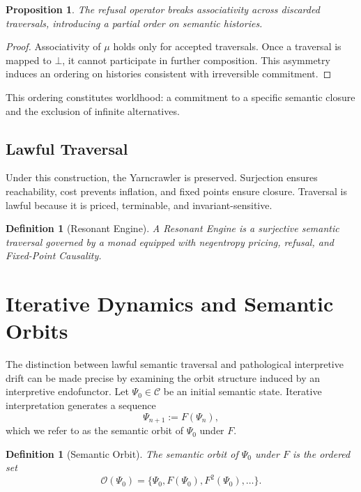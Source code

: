 \documentclass[12pt]{article}
\newtheorem{definition}[theorem]{Definition}
\newtheorem{proposition}[theorem]{Proposition}
\theoremstyle{remark}
\begin{document}
\begin{proposition}
The refusal operator breaks associativity across discarded traversals, introducing a partial order on semantic histories.
\end{proposition}

\begin{proof}
Associativity of $\mu$ holds only for accepted traversals. Once a traversal is mapped to $\bot$, it cannot participate in further composition. This asymmetry induces an ordering on histories consistent with irreversible commitment.
\end{proof}

This ordering constitutes worldhood: a commitment to a specific semantic closure and the exclusion of infinite alternatives.

\subsection{Lawful Traversal}

Under this construction, the Yarncrawler is preserved. Surjection ensures reachability, cost prevents inflation, and fixed points ensure closure. Traversal is lawful because it is priced, terminable, and invariant-sensitive.

\begin{definition}[Resonant Engine]
A Resonant Engine is a surjective semantic traversal governed by a monad equipped with negentropy pricing, refusal, and Fixed-Point Causality.
\end{definition}

\section{Iterative Dynamics and Semantic Orbits}

The distinction between lawful semantic traversal and pathological interpretive drift can be made precise by examining the orbit structure induced by an interpretive endofunctor. Let $\Psi_0 \in \mathcal{C}$ be an initial semantic state. Iterative interpretation generates a sequence
\[
\Psi_{n+1} := F(\Psi_n),
\]
which we refer to as the semantic orbit of $\Psi_0$ under $F$.

\begin{definition}[Semantic Orbit]
The semantic orbit of $\Psi_0$ under $F$ is the ordered set
\[
\mathcal{O}(\Psi_0) = \{\Psi_0, F(\Psi_0), F^2(\Psi_0), \ldots \}.
\]
\end{definition}
\end{document}
